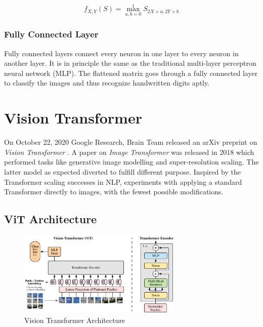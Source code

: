 \documentclass[12pt, a4paper]{report}
\begin{document}
\begin{equation}
    \label{equ:5.8}
    f_{X,Y}(S) = \max_{a,b = 0}^1 S_{2X + a, 2Y + b}
\end{equation}

\subsubsection{Fully Connected Layer}
\label{subsub:fullycnlr}

Fully connected layers connect every neuron in one layer to every neuron in another layer. It is in principle the same as the traditional multi-layer perceptron neural network (MLP). The flattened matrix goes through a fully connected layer to classify the images \cite{wiki:cnns} and thus recognize handwritten digits aptly.

\section{Vision Transformer}
\label{sec:vit}

\hspace{0.5cm} On October 22, 2020 Google Research, Brain Team released an arXiv preprint on \emph{Vision Transformer} \cite{2020arXiv201011929D}. A paper on \emph{Image Transformer} was released in 2018 \cite{2018arXiv180205751P} which performed tasks like generative image modelling and super-resolution scaling. The latter model as expected diverted to fulfill different purpose. Inspired by the Transformer scaling successes in NLP, \cite{2020arXiv201011929D} experiments with applying a standard Transformer \cite{2017arXiv170603762V} directly to images, with the fewest possible modifications.

\subsection{ViT Architecture}
\label{subsec:vitarch}

\begin{figure}[!htbp]
    \centering
    \includegraphics[width=0.7\textwidth]{vision_transformer.png}
    \caption[Vision Transformer Architecture]{Vision Transformer Architecture \cite{2020arXiv201011929D}}
    \label{fig:5.4}
\end{figure}
\end{document}
